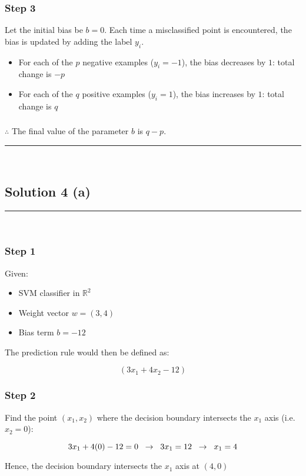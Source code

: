 \documentclass{article}
\begin{document}
\subsubsection*{Step 3}
\parbox{\textwidth}{
Let the initial bias be $b = 0$. Each time a misclassified point is encountered, the bias is updated by adding the label $y_i$.

\begin{itemize}
    \item For each of the $p$ negative examples ($y_i = -1$), the bias decreases by $1$: total change is $-p$
    \item For each of the $q$ positive examples ($y_i = 1$), the bias increases by $1$: total change is $q$
\end{itemize}
}

\subsubsection*{\normalfont}{$\therefore$ The final value of the parameter $b$ is $q - p$.}

\noindent\rule{\textwidth}{0.4pt}\\

\newpage

\subsection*{Solution 4 (a)}
\noindent\rule{\textwidth}{0.4pt}\\

\subsubsection*{Step 1}
\parbox{\textwidth}{
Given:
\begin{itemize}
    \item SVM classifier in $\mathbb{R}^{2}$
    \item Weight vector $w = (3, 4)$
    \item Bias term $b = -12$
\end{itemize}

The prediction rule would then be defined as:

$$\left(3x_{1}+4x_{2}-12\right)$$

} 

\subsubsection*{Step 2}
\parbox{\textwidth}{
Find the point $(x_{1},x_{2})$ where the decision boundary intersects the $x_{1}$ axis (i.e. $x_{2}=0$):

$$3x_1 + 4(0) - 12 = 0 \hspace{0.2cm} \rightarrow \hspace{0.2cm} 3x_1 = 12 \hspace{0.2cm} \rightarrow \hspace{0.2cm} x_1 = 4$$

Hence, the decision boundary intersects the $x_{1}$ axis at $(4,0)$
}
\end{document}
